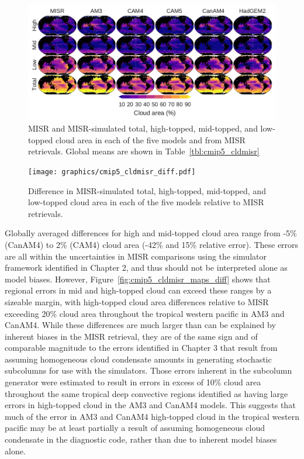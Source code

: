 \begin{figure}[htbp]
\centering
\includegraphics{graphics/cmip5_cldmisr.pdf}
\caption{\label{fig:cmip5_cldmisr_maps}MISR and MISR-simulated total,
high-topped, mid-topped, and low-topped cloud area in each of the five
models and from MISR retrievals. Global means are shown in
Table~\ref{tbl:cmip5_cldmisr}}\label{fig:cmip5ux5fcldmisrux5fmaps}
\end{figure}

\begin{figure}[htbp]
\centering
\texttt{[image: graphics/cmip5\_cldmisr\_diff.pdf]}
\caption{\label{fig:cmip5_cldmisr_maps_diff}Difference in MISR-simulated
total, high-topped, mid-topped, and low-topped cloud area in each of the
five models relative to MISR
retrievals.}\label{fig:cmip5ux5fcldmisrux5fmapsux5fdiff}
\end{figure}

Globally averaged differences for high and mid-topped cloud area range
from -5\% (CanAM4) to 2\% (CAM4) cloud area (-42\% and 15\% relative
error). These errors are all within the uncertainties in MISR
comparisons using the simulator framework identified in Chapter 2, and
thus should not be interpreted alone as model biases. However,
Figure~\ref{fig:cmip5_cldmisr_maps_diff} shows that regional errors in
mid and high-topped cloud can exceed these ranges by a sizeable margin,
with high-topped cloud area differences relative to MISR exceeding 20\%
cloud area throughout the tropical western pacific in AM3 and CanAM4.
While these differences are much larger than can be explained by
inherent biases in the MISR retrieval, they are of the same sign and of
comparable magnitude to the errors identified in Chapter 3 that result
from assuming homogeneous cloud condensate amounts in generating
stochastic subcolumns for use with the simulators. Those errors inherent
in the subcolumn generator were estimated to result in errors in excess
of 10\% cloud area throughout the same tropical deep convective regions
identified as having large errors in high-topped cloud in the AM3 and
CanAM4 models. This suggests that much of the error in AM3 and CanAM4
high-topped cloud in the tropical western pacific may be at least
partially a result of assuming homogeneous cloud condensate in the
diagnostic code, rather than due to inherent model biases alone.

